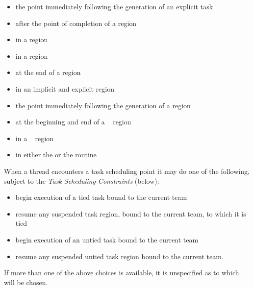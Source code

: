 \begin{itemize}
\item the point immediately following the generation of an explicit task

\item after the point of completion of a  region

\item in a  region

\item in a  region

\item at the end of a  region

\item in an implicit and explicit  region

\item the point immediately following the generation of a  region

\item at the beginning and end of a ~ region

\item in a ~ region 

\item in either the  or the
   routine

\end{itemize}

When a thread encounters a task scheduling point it may do one of the following, 
subject to the \emph{Task Scheduling Constraints} (below):

\begin{itemize}
\item begin execution of a tied task bound to the current team

\item resume any suspended task region, bound to the current team, to which it is tied

\item begin execution of an untied task bound to the current team

\item resume any suspended untied task region bound to the current team.
\end{itemize}

If more than one of the above choices is available, it is unspecified as to which will be 
chosen.


